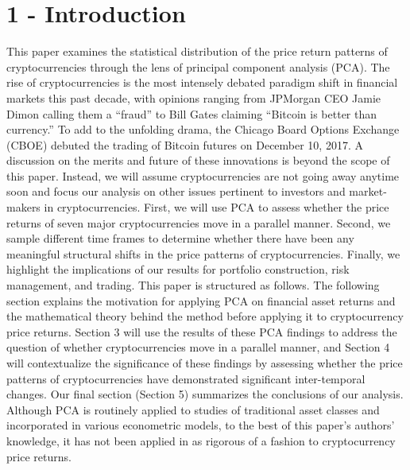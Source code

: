 \documentclass[12pt,twoside]{article}
\begin{document}

\section*{1 - Introduction}
This paper examines the statistical distribution of the price return patterns of cryptocurrencies through the lens of principal component analysis (PCA). The rise of cryptocurrencies is the most intensely debated paradigm shift in financial markets this past decade, with opinions ranging from JPMorgan CEO Jamie Dimon calling them a “fraud” to Bill Gates claiming “Bitcoin is better than currency.” To add to the unfolding drama, the Chicago Board Options Exchange (CBOE) debuted the trading of Bitcoin futures on December 10, 2017. A discussion on the merits and future of these innovations is beyond the scope of this paper.
\bigbreak
Instead, we will assume cryptocurrencies are not going away anytime soon and focus our analysis on other issues pertinent to investors and market-makers in cryptocurrencies. First, we will use PCA to assess whether the price returns of seven major cryptocurrencies move in a parallel manner. Second, we sample different time frames to determine whether there have been any meaningful structural shifts in the price patterns of cryptocurrencies. Finally, we highlight the implications of our results for portfolio construction, risk management, and trading.
\bigbreak
This paper is structured as follows. The following section explains the motivation for applying PCA on financial asset returns and the mathematical theory behind the method before applying it to cryptocurrency price returns. Section 3 will use the results of these PCA findings to address the question of whether cryptocurrencies move in a parallel manner, and Section 4 will contextualize the significance of these findings by assessing whether the price patterns of cryptocurrencies have demonstrated significant inter-temporal changes. Our final section (Section 5) summarizes the conclusions of our analysis. Although PCA is routinely applied to studies of traditional asset classes and incorporated in various econometric models, to the best of this paper’s authors’ knowledge, it has not been applied in as rigorous of a fashion to cryptocurrency price returns.
\end{document}
